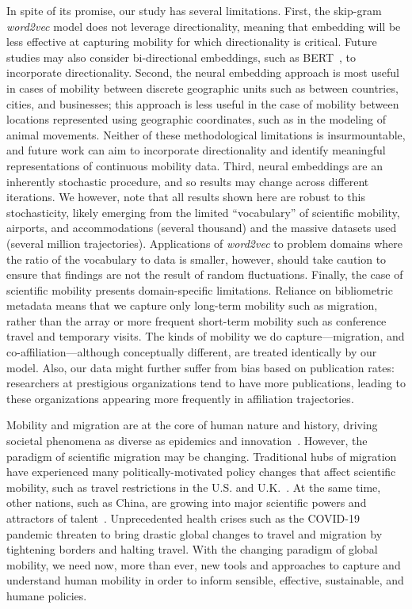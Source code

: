 \documentclass[12pt]{article} %
\begin{document}
In spite of its promise, our study has several limitations.
First, the skip-gram \textit{word2vec} model does not leverage directionality, meaning that embedding will be less effective at capturing mobility for which directionality is critical.
Future studies may also consider bi-directional embeddings, such as BERT~\autocite{devlin2018bert}, to incorporate directionality.
Second, the neural embedding approach is most useful in cases of mobility between discrete geographic units such as between countries, cities, and businesses; this approach is less useful in the case of mobility between locations represented using geographic coordinates, such as in the modeling of animal movements.
Neither of these methodological limitations is insurmountable, and future work can aim to incorporate directionality and identify meaningful representations of continuous mobility data.
Third, neural embeddings are an inherently stochastic procedure, and so results may change across different iterations.
We however, note that all results shown here are robust to this stochasticity, likely emerging from the limited ``vocabulary'' of scientific mobility, airports, and accommodations (several thousand) and the massive datasets used (several million trajectories).
Applications of \textit{word2vec }to problem domains where the ratio of the vocabulary to data is smaller, however, should take caution to ensure that findings are not the result of random fluctuations.
Finally, the case of scientific mobility presents domain-specific limitations.
Reliance on bibliometric metadata means that we capture only long-term mobility such as migration, rather than the array or more frequent short-term mobility such as conference travel and temporary visits.
The kinds of mobility we do capture---migration, and co-affiliation---although conceptually different, are treated identically by our model.
Also, our data might further suffer from bias based on publication rates: researchers at prestigious organizations tend to have more publications, leading to these organizations appearing more frequently in affiliation trajectories.


Mobility and migration are at the core of human nature and history, driving societal phenomena as diverse as epidemics\autocite{kraemer2020covid, truscott2012epidemicgravity} and innovation~\autocite{kaiser2018innovation, sugimoto2017mostimpact, petersen2018multiscale, morgan2018prestige, rodrigues2016mobility}.
However, the paradigm of scientific migration may be changing.
Traditional hubs of migration have experienced many politically-motivated policy changes that affect scientific mobility, such as travel restrictions in the U.S. and U.K.~\autocite{chinchilla2018travelban}.
At the same time, other nations, such as China, are growing into major scientific powers and attractors of talent~\autocite{cao2020returning}.
Unprecedented health crises such as the COVID-19 pandemic threaten to bring drastic global changes to travel and migration by tightening borders and halting travel.
With the changing paradigm of global mobility, we need now, more than ever, new tools and approaches to capture and understand human mobility in order to inform sensible, effective, sustainable, and humane policies.
\end{document}
